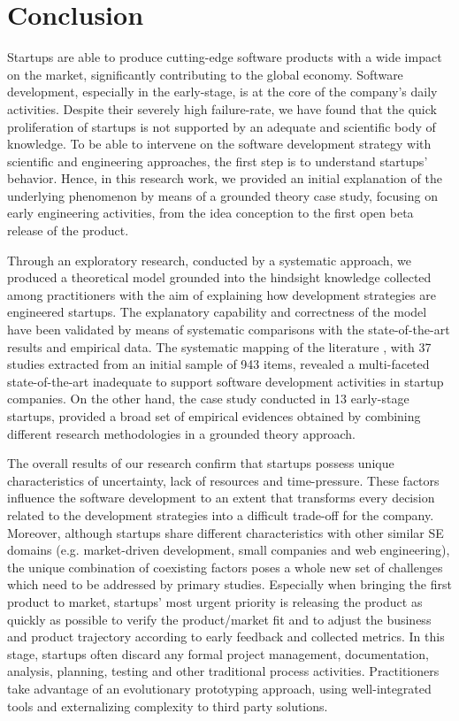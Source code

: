 \documentclass[10pt,journal,letterpaper,compsoc]{IEEEtran}
\begin{document}
\section{Conclusion}
\label{conc}
Startups are able to produce cutting-edge software products with a wide impact on the market, significantly contributing to the global economy. Software development, especially in the early-stage, is at the core of the company's daily activities. Despite their severely high failure-rate, we have found that the quick proliferation of startups is not supported by an adequate and scientific body of knowledge.%
 To be able to intervene on the software development strategy with scientific and engineering approaches, the first step is to understand startups' behavior. Hence, in this research work, we provided an initial explanation of the underlying phenomenon by means of a grounded theory case study, focusing on early engineering activities, from the idea conception to the first open beta release of the product.

Through an exploratory research, conducted by a systematic approach, we produced a theoretical model grounded into the hindsight knowledge collected among practitioners with the aim of explaining how development strategies are engineered startups. The explanatory capability and correctness of the model have been validated by means of systematic comparisons with the state-of-the-art results and empirical data. The systematic mapping of the literature \cite{SMS}, with 37 studies extracted from an initial sample of 943 items, revealed a multi-faceted state-of-the-art inadequate to support software development activities in startup companies. %
On the other hand, the case study conducted in 13 early-stage startups, provided a broad set of empirical evidences obtained by combining different research methodologies in a grounded theory approach.

The overall results of our research confirm that startups possess unique %
characteristics of uncertainty, lack of resources and time-pressure. These factors influence the software development to an extent that transforms every decision related to the development strategies into a difficult trade-off for the company. Moreover, although startups share different characteristics with other similar SE domains (e.g. market-driven development, small companies and web engineering), the unique combination of coexisting factors poses a whole new set of challenges which need to be addressed by primary studies. Especially when bringing the first product to market, startups' most urgent priority is releasing the product as quickly as possible to verify the product/market fit and to adjust the business and product trajectory according to early feedback and collected metrics. In this stage, startups often discard any formal project management, documentation, analysis, planning, testing and other traditional process 
activities. Practitioners take advantage of an evolutionary prototyping approach, using well-integrated tools and externalizing complexity to third party solutions.
\end{document}
